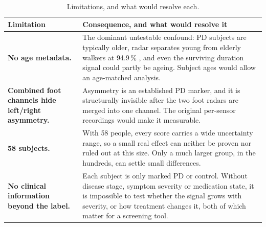 \begin{table}[H]
  \centering
  \caption[Limitations, and what would resolve each]{Limitations, and what would resolve each.}
  \label{tab:limitations}
  \small
  \begin{tabular}{@{}L{4.4cm}L{9.9cm}@{}}
    \toprule
    \textbf{Limitation} & \textbf{Consequence, and what would resolve it} \\
    \midrule
    \textbf{No age metadata.} &
    The dominant untestable confound: PD subjects are typically older, radar
    separates young from elderly walkers at 94.9\,\% \cite{hayashi2021}, and
    even the surviving duration signal could partly be ageing. Subject ages
    would allow an age-matched analysis. \\
    \addlinespace
    \textbf{Combined foot channels hide left/right asymmetry.} &
    Asymmetry is an established PD marker, and it is structurally invisible
    after the two foot radars are merged into one channel. The original
    per-sensor recordings would make it measurable. \\
    \addlinespace
    \textbf{58 subjects.} &
    With 58 people, every score carries a wide uncertainty range, so a small
    real effect can neither be proven nor ruled out at this size. Only a
    much larger group, in the hundreds, can settle small differences. \\
    \addlinespace
    \textbf{No clinical information beyond the label.} &
    Each subject is only marked PD or control. Without disease stage,
    symptom severity or medication state, it is impossible to test whether
    the signal grows with severity, or how treatment changes it, both of
    which matter for a screening tool. \\
    \bottomrule
  \end{tabular}
\end{table}
